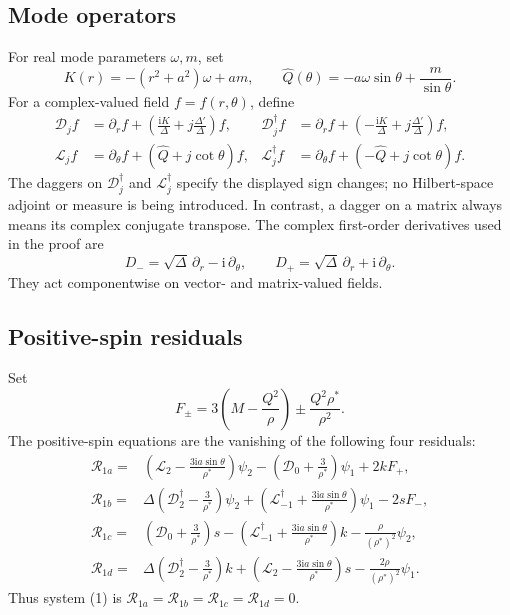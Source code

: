 \documentclass[11pt,a4paper]{article}
\numberwithin{equation}{section}
\theoremstyle{definition}
\theoremstyle{remark}
\newcommand{\I}{\mathrm i}
\newcommand{\D}{\mathcal D}
\newcommand{\Lop}{\mathcal L}
\newcommand{\Res}{\mathcal R}
\begin{document}
\subsection{Mode operators}

For real mode parameters \(\omega,m\), set
\begin{equation}
 K(r)=-(r^2+a^2)\omega+am,\qquad
 \widehat Q(\theta)=-a\omega\sin\theta+\frac{m}{\sin\theta}.
\label{eq:KQ}
\end{equation}
For a complex-valued field \(f=f(r,\theta)\), define
\begin{align}
 \D_j f&=\partial_r f+
 \left(\frac{\I K}{\Delta}+j\frac{\Delta'}{\Delta}\right)f,
&
 \D_j^\dagger f&=\partial_r f+
 \left(-\frac{\I K}{\Delta}+j\frac{\Delta'}{\Delta}\right)f,
\label{eq:Doperators}\\
 \Lop_j f&=\partial_\theta f+
 \left(\widehat Q+j\cot\theta\right)f,
&
 \Lop_j^\dagger f&=\partial_\theta f+
 \left(-\widehat Q+j\cot\theta\right)f.
\label{eq:Loperators}
\end{align}
The daggers on \(\D_j^\dagger\) and \(\Lop_j^\dagger\) specify the
displayed sign changes; no Hilbert-space adjoint or measure is being
introduced.  In contrast, a dagger on a matrix always means its complex
conjugate transpose.
The complex first-order derivatives used in the proof are
\begin{equation}
 D_-=\sqrt{\Delta}\,\partial_r-\I\,\partial_\theta,\qquad
 D_+=\sqrt{\Delta}\,\partial_r+\I\,\partial_\theta.
\label{eq:Dpm}
\end{equation}
They act componentwise on vector- and matrix-valued fields.

\subsection{Positive-spin residuals}

Set
\begin{equation}
 F_\pm=3\left(M-\frac{Q^2}{\rho}\right)
 \mathbin{\pm}\frac{Q^2\rho^*}{\rho^2}.
\label{eq:Fpm}
\end{equation}
The positive-spin equations are the vanishing of the following four
residuals:
\begin{align}
 \Res_{1a}={}&
 \left(\Lop_2-\frac{3\I a\sin\theta}{\rho^*}\right)\psi_2
 -\left(\D_0+\frac{3}{\rho^*}\right)\psi_1+2kF_+,
\label{eq:R1a}\\
 \Res_{1b}={}&
 \Delta\left(\D_2^\dagger-\frac{3}{\rho^*}\right)\psi_2
 +\left(\Lop_{-1}^\dagger+\frac{3\I a\sin\theta}{\rho^*}\right)\psi_1
 -2sF_-,
\label{eq:R1b}\\
 \Res_{1c}={}&
 \left(\D_0+\frac{3}{\rho^*}\right)s
 -\left(\Lop_{-1}^\dagger+\frac{3\I a\sin\theta}{\rho^*}\right)k
 -\frac{\rho}{(\rho^*)^2}\psi_2,
\label{eq:R1c}\\
 \Res_{1d}={}&
 \Delta\left(\D_2^\dagger-\frac{3}{\rho^*}\right)k
 +\left(\Lop_2-\frac{3\I a\sin\theta}{\rho^*}\right)s
 -\frac{2\rho}{(\rho^*)^2}\psi_1.
\label{eq:R1d}
\end{align}
Thus system (1) is \(\Res_{1a}=\Res_{1b}=\Res_{1c}=\Res_{1d}=0\).
\end{document}
